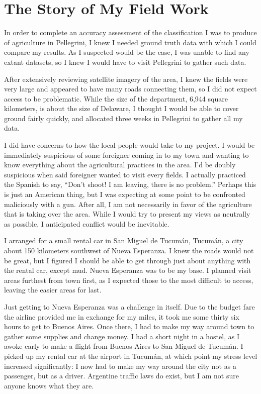 \chapter{The Story of My Field Work}
\label{appendix:fieldwork}

In order to complete an accuracy assessment of the classification I was to produce of agriculture in Pellegrini, I knew I needed ground truth data with which I could compare my results. As I suspected would be the case, I was unable to find any extant datasets, so I knew I would have to visit Pellegrini to gather such data.

After extensively reviewing satellite imagery of the area, I knew the fields were very large and appeared to have many roads connecting them, so I did not expect access to be problematic. While the size of the department, 6,944 square kilometers, is about the size of Delaware, I thought I would be able to cover ground fairly quickly, and allocated three weeks in Pellegrini to gather all my data.

I did have concerns to how the local people would take to my project. I would be immediately suspicious of some foreigner coming in to my town and wanting to know everything about the agricultural practices in the area. I'd be doubly suspicious when said foreigner wanted to visit every fields. I actually practiced the Spanish to say, ``Don’t shoot! I am leaving, there is no problem.'' Perhaps this is just an American thing, but I was expecting at some point to be confronted maliciously with a gun. After all, I am not necessarily in favor of the agriculture that is taking over the area. While I would try to present my views as neutrally as possible, I anticipated conflict would be inevitable.

I arranged for a small rental car in San Miguel de Tucumán, Tucumán, a city about 150 kilometers southwest of Nueva Esperanza. I knew the roads would not be great, but I figured I should be able to get through just about anything with the rental car, except mud. Nueva Esperanza was to be my base. I planned visit areas furthest from town first, as I expected those to the most difficult to access, leaving the easier areas for last.

Just getting to Nueva Esperanza was a challenge in itself. Due to the budget fare the airline provided me in exchange for my miles, it took me some thirty six hours to get to Buenos Aires. Once there, I had to make my way around town to gather some supplies and change money. I had a short night in a hostel, as I awoke early to make a flight from Buenos Aires to San Miguel de Tucumán. I picked up my rental car at the airport in Tucumán, at which point my stress level increased significantly: I now had to make my way around the city not as a passenger, but as a driver. Argentine traffic laws do exist, but I am not sure anyone knows what they are.

